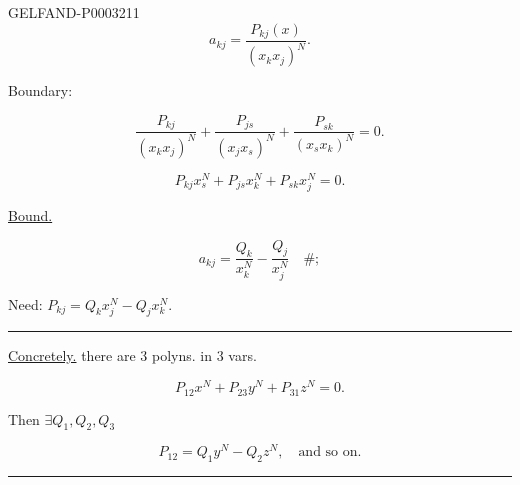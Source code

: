 \begin{GelfandAdjacentEvidence}{GELFAND-P000321}{1}
\begin{equation*}a_{kj}=\frac{P_{kj}(x)}{(x_k x_j)^N}.\end{equation*}

\end{GelfandAdjacentEvidence}


Boundary:

\begin{equation*}\frac{P_{kj}}{(x_k x_j)^N}+\frac{P_{js}}{(x_j x_s)^N}+\frac{P_{sk}}{(x_s x_k)^N}=0.\end{equation*}

\begin{equation*}\boxed{P_{kj}x_s^N+P_{js}x_k^N+P_{sk}x_j^N=0}.\end{equation*}

\uline{Bound.}

\begin{equation*}a_{kj}=\frac{Q_k}{x_k^N}-\frac{Q_j}{x_j^N}\quad\#;\end{equation*}

Need: $P_{kj}=Q_k x_j^N-Q_j x_k^N$.

\begin{center}\rule{.9\linewidth}{.3pt}\end{center}

\uline{Concretely.} there are $3$ polyns. in $3$ vars.

\begin{equation*}P_{12}x^N+P_{23}y^N+P_{31}z^N=0.\end{equation*}

Then $\exists Q_1, Q_2, Q_3$

\begin{equation*}P_{12}=Q_1 y^N-Q_2 z^N,\quad\text{and so on.}\end{equation*}

\begin{center}\rule{.9\linewidth}{.3pt}\end{center}

